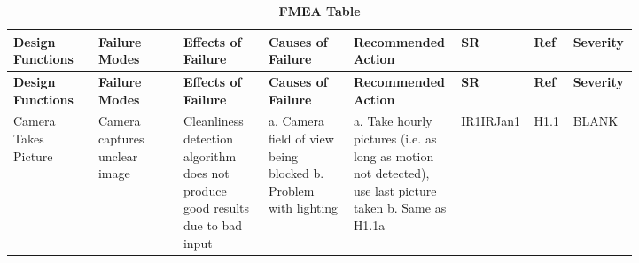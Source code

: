\documentclass{article}
\begin{document}
\begin{longtable}{|>{\raggedright\arraybackslash}p{0.13\linewidth} | >{\raggedright\arraybackslash}p{0.13\linewidth} | >{\raggedright\arraybackslash}p{0.13\linewidth}| >{\raggedright\arraybackslash}p{0.13\linewidth}| >{\raggedright\arraybackslash}p{0.13\linewidth}| >{\raggedright\arraybackslash}p{0.05\linewidth}| >{\raggedright\arraybackslash}p{0.05\linewidth}| >{\raggedright\arraybackslash}p{0.07\linewidth}|}
    \caption{\bf FMEA Table} \label{tab:my_label} \\
    
    \hline
    \textbf{Design Functions} & \textbf{Failure Modes} & \textbf{Effects of Failure} & \textbf{Causes of Failure} & \textbf{Recommended Action} & \textbf{SR} & \textbf{Ref} & \textbf{Severity}\\
    \hline
    \endfirsthead
    
    \hline
    \textbf{Design Functions} & \textbf{Failure Modes} & \textbf{Effects of Failure} & \textbf{Causes of Failure} & \textbf{Recommended Action} & \textbf{SR} & \textbf{Ref} & \textbf{Severity}\\
    \hline
    \endhead
    
    \hline
    \endfoot
    
    \hline
    \endlastfoot


    \hline
    Camera Takes Picture & Camera captures unclear image \newline & Cleanliness detection algorithm does not produce good results due to bad input\newline & a. Camera field of view being blocked \newline b. Problem with lighting  \newline & a. Take hourly pictures (i.e. as long as motion not detected), use last picture taken \newline b. Same as H1.1a  \newline & IR1\newline IRJan1  \newline & H1.1  \newline & BLANK\\
    

\end{longtable}
\end{document}
